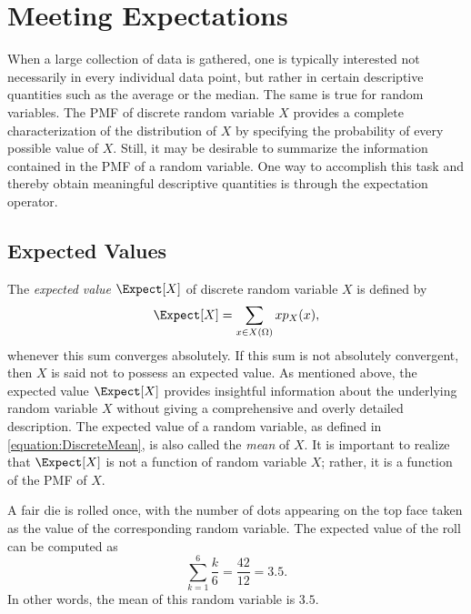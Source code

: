 \chapter{Meeting Expectations}
\label{chapter:ExpectationsDiscrete}

When a large collection of data is gathered, one is typically interested not necessarily in every individual data point, but rather in certain descriptive quantities such as the average or the median.
The same is true for random variables.
The PMF of discrete random variable $X$ provides a complete characterization of the distribution of $X$ by specifying the probability of every possible value of $X$.
Still, it may be desirable to summarize the information contained in the PMF of a random variable.
One way to accomplish this task and thereby obtain meaningful descriptive quantities is through the expectation operator.


\section{Expected Values}

The \emph{expected value} $\Expect [X]$ of discrete random variable $X$ is defined by 
\begin{equation} \label{equation:DiscreteMean}
\Expect [X] = \sum_{x \in X(\Omega)} x p_X (x) ,
\end{equation}
whenever this sum converges absolutely.
If this sum is not absolutely convergent, then $X$ is said not to possess an expected value.
As mentioned above, the expected value $\Expect [X]$ provides insightful information about the underlying random variable $X$ without giving a comprehensive and overly detailed description.
The expected value of a random variable, as defined in \eqref{equation:DiscreteMean}, is also called the \emph{mean} of $X$. 
It is important to realize that $\Expect [X]$ is not a function of random variable $X$; rather, it is a function of the PMF of $X$.

\begin{example}
A fair die is rolled once, with the number of dots appearing on the top face taken as the value of the corresponding random variable.
The expected value of the roll can be computed as
\begin{equation*}
\sum_{k=1}^6 \frac{k}{6} = \frac{42}{12} = 3.5 .
\end{equation*}
In other words, the mean of this random variable is $3.5$.
\end{example}

